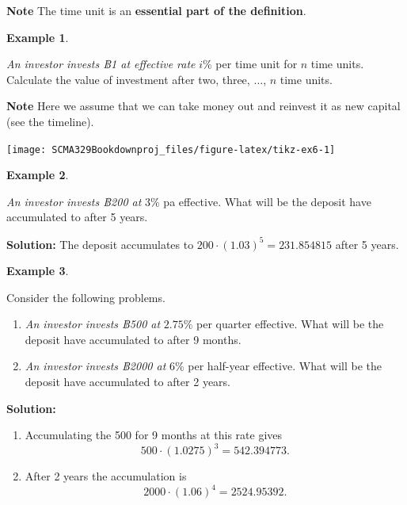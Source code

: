 \documentclass[
]{book}
\theoremstyle{definition}
\theoremstyle{definition}
\newtheorem{example}{Example}[chapter]
\theoremstyle{definition}
\theoremstyle{definition}
\theoremstyle{remark}
\begin{document}
\textbf{Note} The time unit is an \textbf{essential part of the definition}.

\begin{example}
\protect\hypertarget{exm:unlabeled-div-10}{}\label{exm:unlabeled-div-10}

\emph{An investor invests ฿1 at effective rate} \(i\)\% per time unit for \(n\)
time units. Calculate the value of investment after two, three,
\(\ldots\), \(n\) time units.

\end{example}

\textbf{Note} Here we assume that we can take money out and reinvest it as
new capital (see the timeline).

\begin{center}\texttt{[image: SCMA329Bookdownproj\_files/figure-latex/tikz-ex6-1]} \end{center}

\begin{example}
\protect\hypertarget{exm:unlabeled-div-11}{}\label{exm:unlabeled-div-11}

\emph{An investor invests ฿200 at} \(3\)\% pa effective. What will be the
deposit have accumulated to after 5 years.

\end{example}

\textbf{Solution:} The deposit accumulates to
\(200 \cdot (1.03)^5 = 231.854815\) after 5 years.

\begin{example}
\protect\hypertarget{exm:unlabeled-div-12}{}\label{exm:unlabeled-div-12}

Consider the following problems.

\begin{enumerate}
\def\labelenumi{\arabic{enumi}.}
\item
  \emph{An investor invests ฿500 at} \(2.75\)\% per quarter effective. What
  will be the deposit have accumulated to after 9 months.
\item
  \emph{An investor invests ฿2000 at} \(6\)\% per half-year effective. What
  will be the deposit have accumulated to after 2 years.
\end{enumerate}

\end{example}

\textbf{Solution:}

\begin{enumerate}
\def\labelenumi{\arabic{enumi}.}
\item
  Accumulating the 500 for 9 months at this rate gives
  \[500 \cdot (1.0275)^3 = 542.394773.\]
\item
  After 2 years the accumulation is
  \[2000 \cdot (1.06)^4 = 2524.95392.\]
\end{enumerate}
\end{document}
